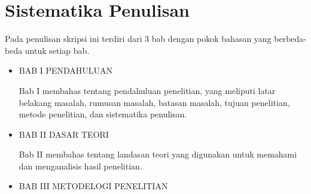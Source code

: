 \section{Sistematika Penulisan}
\hspace{0.5cm} Pada penulisan skripsi ini terdiri dari 3 bab dengan pokok bahasan yang berbeda-beda untuk setiap bab.
\begin{itemize}
    \item BAB I PENDAHULUAN

    Bab I membahas tentang pendahuluan penelitian, yang meliputi latar belakang masalah, rumusan masalah, batasan masalah, tujuan penelitian, metode penelitian, dan sistematika penulisan.
    
    \item BAB II DASAR TEORI

    Bab II membahas tentang landasan teori yang digunakan untuk memahami dan menganalisis hasil penelitian.
    
    \item BAB III METODELOGI PENELITIAN
\end{itemize}